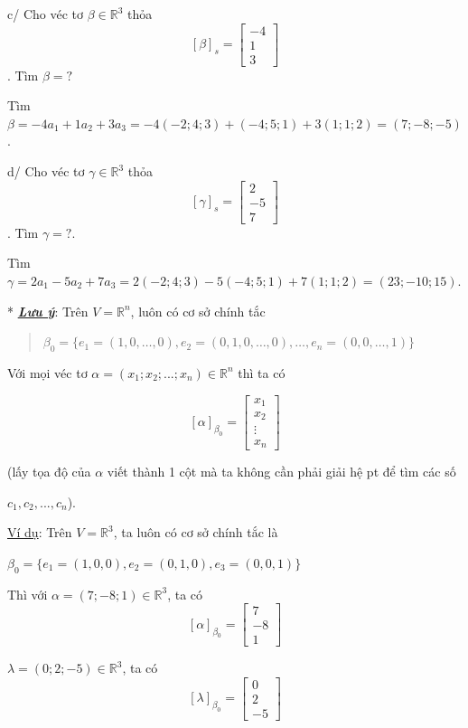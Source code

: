 \documentclass[12pt,a4paper]{article}
\newcommand{\ul}[1]{\uline{#1}}
\begin{document}
c/ Cho véc tơ $\beta \in \mathbb{R}^3$ thỏa
\[[\beta]_s = \begin{bmatrix} -4 \\ 1 \\ 3 \end{bmatrix}\]. Tìm
$\beta =?$

Tìm $\beta = -4a_1 + 1a_2 + 3a_3 = -4(-2; 4; 3) + (-4; 5; 1) + 3(1; 1; 2) = (7; -8; -5)$.

d/ Cho véc tơ $\gamma \in \mathbb{R}^3$ thỏa
\[[\gamma]_s = \begin{bmatrix} 2 \\ -5 \\ 7 \end{bmatrix}\]. Tìm
$\gamma =?$.

Tìm $\gamma = 2a_1 - 5a_2 + 7a_3 = 2(-2; 4; 3) - 5(-4; 5; 1) + 7(1; 1; 2) = (23; -10; 15)$.

* \emph{\textbf{\ul{Lưu ý}}}: Trên
$V = \mathbb{R}^n$, luôn có cơ sở chính
tắc

\begin{quote}
$\beta_0 = \{e_1 = (1, 0, \dots, 0), e_2 = (0, 1, 0, \dots, 0), \dots, e_n = (0, 0, \dots, 1)\}$
\end{quote}

Với mọi véc tơ $\alpha = (x_1; x_2; ...; x_n) \in \mathbb{R}^n$ thì ta
có

\[[\alpha]_{\beta_0} = \begin{bmatrix} x_1 \\ x_2 \\ \vdots \\ x_n \end{bmatrix}\]

(lấy tọa độ của $\alpha$ viết
thành 1 cột mà ta không cần phải giải hệ pt để tìm các số

$c_1, c_2, ..., c_n$).

\ul{Ví dụ}: Trên $V = \mathbb{R}^3$, ta
luôn có cơ sở chính tắc là

$\beta_0 = \{e_1 = (1, 0, 0), e_2 = (0, 1, 0), e_3 = (0, 0, 1)\}$

Thì với $\alpha = (7; -8; 1) \in \mathbb{R}^3$, ta có
\[[\alpha]_{\beta_0} = \begin{bmatrix} 7 \\ -8 \\ 1 \end{bmatrix}\]

$\lambda = (0; 2; -5) \in \mathbb{R}^3$, ta có
\[[\lambda]_{\beta_0} = \begin{bmatrix} 0 \\ 2 \\ -5 \end{bmatrix}\]
\end{document}
